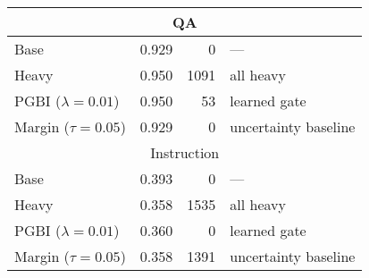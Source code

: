 \begin{tabular}{lrrl}\toprule
\multicolumn{4}{c}{QA}\\\midrule
Base & 0.929 & 0 & — \\
Heavy & 0.950 & 1091 & all heavy \\
PGBI ($\lambda=0.01$) & 0.950 & 53 & learned gate \\
Margin ($\tau=0.05$) & 0.929 & 0 & uncertainty baseline \\
\midrule\multicolumn{4}{c}{Instruction}\\\midrule
Base & 0.393 & 0 & — \\
Heavy & 0.358 & 1535 & all heavy \\
PGBI ($\lambda=0.01$) & 0.360 & 0 & learned gate \\
Margin ($\tau=0.05$) & 0.358 & 1391 & uncertainty baseline \\
\bottomrule\end{tabular}
